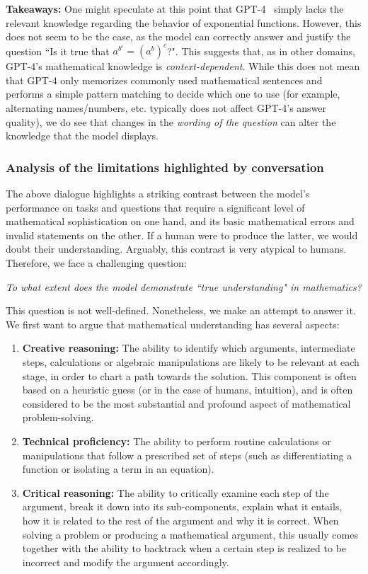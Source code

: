 {\bf Takeaways:} One might speculate at this point that GPT-4 \ simply lacks the relevant knowledge regarding the behavior of exponential functions. However, this does not seem to be the case, as the model can correctly answer and justify the question ``Is it true that $a^{b^c} = (a^b)^c$?". This suggests that, as in other domains, GPT-4's mathematical knowledge is \textit{context-dependent}. While this does not mean that {GPT-4} only memorizes commonly used mathematical sentences and performs a simple pattern matching to decide which one to use (for example, alternating names/numbers, etc. typically does not affect {GPT-4}'s answer quality), we do see that changes in the \emph{wording of the question} can alter the knowledge that the model displays.

\subsubsection{Analysis of the limitations highlighted by conversation} The above dialogue highlights a striking contrast between the model's performance on tasks and questions that require a significant level of mathematical sophistication on one hand, and its basic mathematical errors and invalid statements on the other. If a human were to produce the latter, we would doubt their understanding. Arguably, this contrast is very atypical to humans. Therefore, we face a challenging question:

\begin{center}
\emph{To what extent does the model demonstrate ``true understanding" in mathematics?}
\end{center}

This question is not well-defined. Nonetheless, we make an attempt to answer it. We first want to argue that mathematical understanding has several aspects:

\begin{enumerate}
\item 
\textbf{Creative reasoning:} The ability to identify which arguments, intermediate steps, calculations or algebraic manipulations are likely to be relevant at each stage, in order to chart a path towards the solution. This component is often based on a heuristic guess (or in the case of humans, intuition), and is often considered to be the most substantial and profound aspect of mathematical problem-solving.
\item
\textbf{Technical proficiency:} The ability to perform routine calculations or manipulations that follow a prescribed set of steps (such as differentiating a function or isolating a term in an equation).
\item
\textbf{Critical reasoning:} The ability to critically examine each step of the argument, break it down into its sub-components, explain what it entails, how it is related to the rest of the argument and why it is correct. When solving a problem or producing a mathematical argument, this usually comes together with the ability to backtrack when a certain step is realized to be incorrect and modify the argument accordingly.
\end{enumerate}

